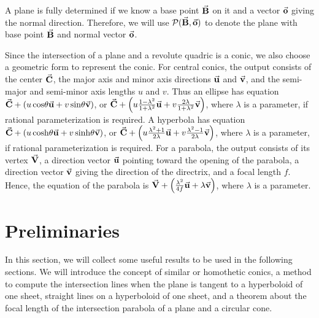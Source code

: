      A plane is fully determined if we know a base point $\vec{\bf B}$ on it and
a vector $\vec{\bf o}$ giving the normal direction.  Therefore, we will use
${\cal P}(\vec{\bf B},\vec{\bf o})$ to denote the plane with base point
$\vec{\bf B}$ and normal vector $\vec{\bf o}$.

     Since the intersection of a plane and a revolute quadric is a conic,
we also choose a geometric form to represent the conic.  For central conics,
the output consists of the center $\vec{\bf C}$, the major axis and minor axis
directions $\vec{\bf u}$ and $\vec{\bf v}$, and the semi-major and semi-minor
axis lengths $u$ and $v$.  Thus an ellipse has equation
$\vec{\bf C}+(u\cos\!\theta\vec{\bf u}+ v\sin\!\theta\vec{\bf v})$, or 
$\vec{\bf C}+\left(u\frac{1-\lambda^2}{1+\lambda^2}\vec{\bf u}+
v\frac{2\lambda}{1+\lambda^2}\vec{\bf v}\right)$, where $\lambda$ is a parameter,
if rational parameterization is required.  A hyperbola has equation
$\vec{\bf C}+(u\cosh\!\theta\vec{\bf u}+v\sinh\!\theta\vec{\bf v})$, or
$\vec{\bf C}+\left(u\frac{\lambda^2+1}{2\lambda}\vec{\bf u}+
v\frac{\lambda^2-1}{2\lambda}\vec{\bf v}\right)$, where $\lambda$ is
a parameter, if rational parameterization is required.  
For a parabola, the output consists of its vertex
$\vec{\bf V}$, a direction vector $\vec{\bf u}$ pointing toward the opening of the 
parabola, a direction vector $\vec{\bf v}$ giving the direction of the directrix,
and a focal length $f$.  Hence, the equation of the parabola is
$\vec{\bf V}+\left(\frac{\lambda^2}{4f}\vec{\bf u}+\lambda\vec{\bf v}\right)$,
where $\lambda$ is a parameter.


\section{Preliminaries}
\label{section:preliminaries}

     In this section, we will collect some useful results to be used in the
following sections.  We will introduce the concept of similar or homothetic 
conics, a method to compute the intersection lines when the plane is tangent 
to a hyperboloid of one sheet, straight lines on a hyperboloid of one sheet, 
and a theorem about the focal length of the intersection parabola of a plane 
and a circular cone.

